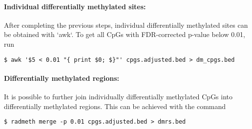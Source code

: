 \documentclass[10pt]{article}
\begin{document}
\paragraph{Individual differentially methylated sites:} After completing the 
previous steps, individual differentially methylated sites can be obtained with 
`awk`. To get all CpGs with FDR-corrected p-value below 0.01, run

{\small{%
\begin{verbatim}
$ awk '$5 < 0.01 "{ print $0; $}"' cpgs.adjusted.bed > dm_cpgs.bed
\end{verbatim}%
}}

\paragraph{Differentially methylated regions:} It is possible to further join 
individually differentially methylated CpGs into differentially methylated 
regions. This can be achieved with the command
{\small{%
\begin{verbatim}
$ radmeth merge -p 0.01 cpgs.adjusted.bed > dmrs.bed
\end{verbatim}%
}}
\end{document}
